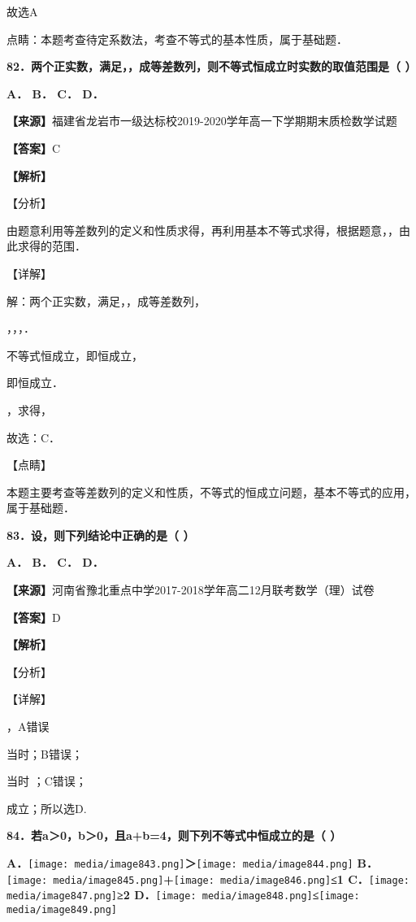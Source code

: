 故选A

点睛：本题考查待定系数法，考查不等式的基本性质，属于基础题．

\textbf{82．两个正实数，满足，，成等差数列，则不等式恒成立时实数的取值范围是（
）}

\textbf{A． B． C． D．}

\textbf{【来源】}福建省龙岩市一级达标校2019-2020学年高一下学期期末质检数学试题

\textbf{【答案】}C

\textbf{【解析】}

【分析】

由题意利用等差数列的定义和性质求得，再利用基本不等式求得，根据题意，，由此求得的范围．

【详解】

解：两个正实数，满足，，成等差数列，

，，，．

不等式恒成立，即恒成立，

即恒成立．

，求得，

故选：C．

【点睛】

本题主要考查等差数列的定义和性质，不等式的恒成立问题，基本不等式的应用，属于基础题．

\textbf{83．设，则下列结论中正确的是（ ）}

\textbf{A． B． C． D．}

\textbf{【来源】}河南省豫北重点中学2017-2018学年高二12月联考数学（理）试卷

\textbf{【答案】}D

\textbf{【解析】}

【分析】

【详解】

，A错误

当时；B错误；

当时 ；C错误；

成立；所以选D.

\textbf{84．若a＞0，b＞0，且a+b=4，则下列不等式中恒成立的是（ ）}

\textbf{A．}\texttt{[image: media/image843.png]}\textbf{＞}\texttt{[image: media/image844.png]}
\textbf{B．}\texttt{[image: media/image845.png]}\textbf{+}\texttt{[image: media/image846.png]}\textbf{≤1
C．}\texttt{[image: media/image847.png]}\textbf{≥2
D．}\texttt{[image: media/image848.png]}\textbf{≤}\texttt{[image: media/image849.png]}

